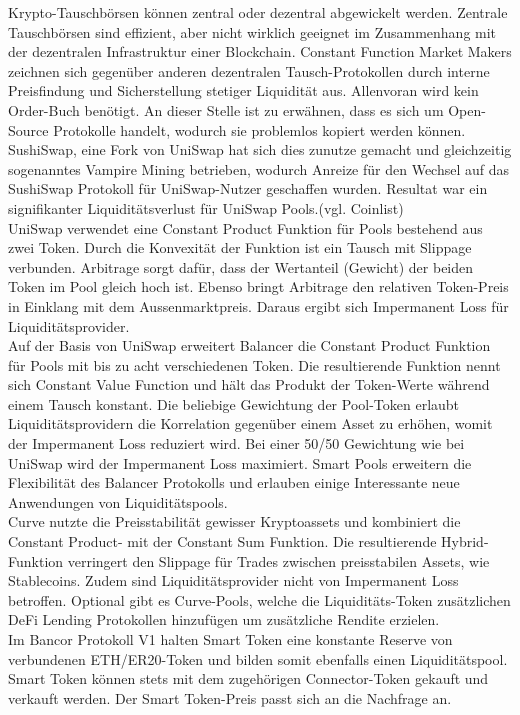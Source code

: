 \documentclass[12pt,a4paper,titlepage,oneside,english]{article}
\begin{document}
Krypto-Tauschbörsen können zentral oder dezentral abgewickelt werden. Zentrale Tauschbörsen sind effizient, aber nicht wirklich geeignet im Zusammenhang mit der dezentralen Infrastruktur einer Blockchain. Constant Function Market Makers zeichnen sich gegenüber anderen dezentralen Tausch-Protokollen durch interne Preisfindung und Sicherstellung stetiger Liquidität aus. Allenvoran wird kein Order-Buch benötigt. An dieser Stelle ist zu erwähnen, dass es sich um Open-Source Protokolle handelt, wodurch sie problemlos kopiert werden können. SushiSwap, eine Fork von UniSwap hat sich dies zunutze gemacht und gleichzeitig sogenanntes Vampire Mining betrieben, wodurch Anreize für den Wechsel auf das SushiSwap Protokoll für UniSwap-Nutzer geschaffen wurden. Resultat war ein signifikanter Liquiditätsverlust für UniSwap Pools.(vgl. Coinlist)\\
UniSwap verwendet eine Constant Product Funktion für Pools bestehend aus zwei Token. Durch die Konvexität der Funktion ist ein Tausch mit Slippage verbunden. Arbitrage sorgt dafür, dass der Wertanteil (Gewicht) der beiden Token im Pool gleich hoch ist. Ebenso bringt Arbitrage den relativen Token-Preis in Einklang mit dem Aussenmarktpreis. Daraus ergibt sich Impermanent Loss für Liquiditätsprovider.\\
Auf der Basis von UniSwap erweitert Balancer die Constant Product Funktion für Pools mit bis zu acht verschiedenen Token. Die resultierende Funktion nennt sich Constant Value Function und hält das Produkt der Token-Werte während einem Tausch konstant. Die beliebige Gewichtung der Pool-Token erlaubt Liquiditätsprovidern die Korrelation gegenüber einem Asset zu erhöhen, womit der Impermanent Loss reduziert wird. Bei einer 50/50 Gewichtung wie bei UniSwap wird der Impermanent Loss maximiert. Smart Pools erweitern die Flexibilität des Balancer Protokolls und erlauben einige Interessante neue Anwendungen von Liquiditätspools. \\
Curve nutzte die Preisstabilität gewisser Kryptoassets und kombiniert die Constant Product- mit der Constant Sum Funktion. Die resultierende Hybrid-Funktion verringert den Slippage für Trades zwischen preisstabilen Assets, wie Stablecoins. Zudem sind Liquiditätsprovider nicht von Impermanent Loss betroffen. Optional gibt es Curve-Pools, welche die Liquiditäts-Token zusätzlichen DeFi Lending Protokollen hinzufügen um zusätzliche Rendite erzielen. \\
Im Bancor Protokoll V1 halten Smart Token eine konstante Reserve von verbundenen ETH/ER20-Token und bilden somit ebenfalls einen Liquiditätspool. Smart Token können stets mit dem zugehörigen Connector-Token gekauft und verkauft werden. Der Smart Token-Preis passt sich an die Nachfrage an. %
\end{document}
